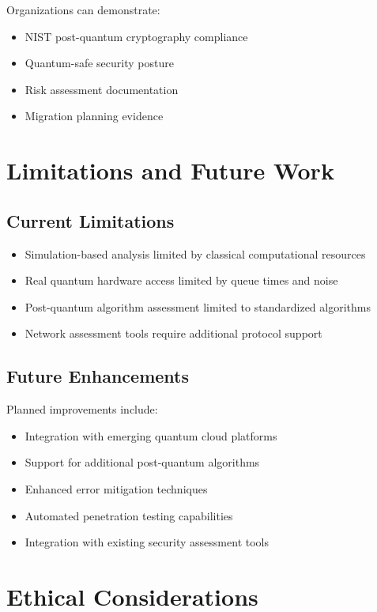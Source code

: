 \documentclass[11pt]{article}
\begin{document}
Organizations can demonstrate:
\begin{itemize}
\item NIST post-quantum cryptography compliance
\item Quantum-safe security posture
\item Risk assessment documentation
\item Migration planning evidence
\end{itemize}

\section{Limitations and Future Work}

\subsection{Current Limitations}

\begin{itemize}
\item Simulation-based analysis limited by classical computational resources
\item Real quantum hardware access limited by queue times and noise
\item Post-quantum algorithm assessment limited to standardized algorithms
\item Network assessment tools require additional protocol support
\end{itemize}

\subsection{Future Enhancements}

Planned improvements include:
\begin{itemize}
\item Integration with emerging quantum cloud platforms
\item Support for additional post-quantum algorithms
\item Enhanced error mitigation techniques
\item Automated penetration testing capabilities
\item Integration with existing security assessment tools
\end{itemize}

\section{Ethical Considerations}
\end{document}
